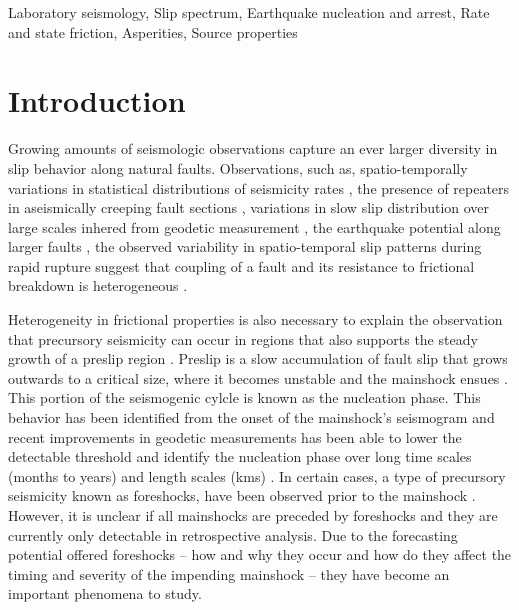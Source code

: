 \documentclass[final,3p, 11pt,authoryear]{elsarticle}
\begin{document}
\begin{frontmatter}
\begin{keyword}
Laboratory seismology, Slip spectrum, Earthquake nucleation and arrest, Rate and state friction, Asperities, Source properties
\end{keyword}

\end{frontmatter}




\section{Introduction}
\label{int}
Growing amounts of seismologic observations capture an ever larger diversity in slip behavior along natural faults. Observations, such as, spatio-temporally variations in statistical distributions of seismicity rates \citep{Tormann2014, Tormann2015, Gulia2016, Guila2019}, the presence of repeaters in aseismically creeping fault sections \citep[e.g.][]{Nadeau1994, McEvilly1999, Shirezaei2013, Uchida2019}, variations in slow slip distribution over large scales inhered from geodetic measurement  \citep[e.g.][]{Brodsky2014, Ruiz2014, Socquet2017}, the earthquake potential along larger faults \citep{Burgmann2000, Burgmann2014}, the observed variability in spatio-temporal slip patterns during rapid rupture \citep[e.g.][]{Mai2002, Tinti2005, Dreger2007, Galvez2016, Mai2017} suggest that coupling of a fault and its resistance to frictional breakdown is heterogeneous . 

Heterogeneity in frictional properties is also necessary to explain the observation that precursory seismicity can occur in regions that also supports the steady growth of a preslip region \citep{Kato2012, Kato2016, Obara2016, Ruiz2014, Bouchon2013, Burgmann2014}. Preslip is a slow accumulation of fault slip that grows outwards to a critical size, where it becomes unstable and the mainshock ensues \citep{Ohnaka1992, Ben-Zion2010}. This portion of the seismogenic cylcle is known as the nucleation phase. This behavior has been identified from the onset of the mainshock's seismogram \citep{Iio1995, Ellsworth1995, Beroza1996} and recent improvements in geodetic measurements has been able to lower the detectable threshold and identify the nucleation phase over long time scales (months to years) and length scales (kms) \citep[e.g.,][]{ Ruiz2014, Socquet2017}.  In certain cases, a type of precursory seismicity known as foreshocks, have been observed prior to the mainshock \citep{Dodge1995, Dodge1996, Bouchon2011}. However, it is unclear if all mainshocks are preceded by foreshocks \citep{Brodsky2014, Mignan2014, Seif2018} and they are currently only detectable in retrospective analysis. Due to the forecasting potential offered foreshocks -- how and why they occur and how do they affect the timing and severity of the impending mainshock -- they have become an important phenomena to study.
\end{document}
